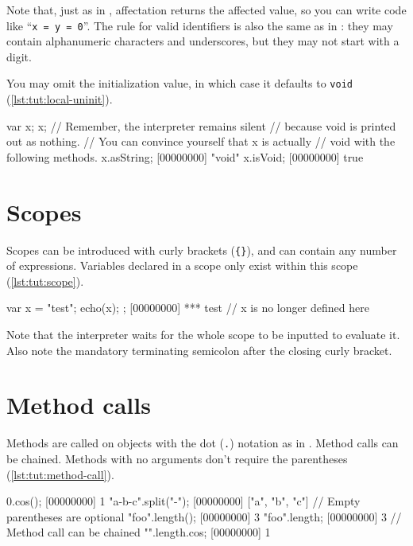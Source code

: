 Note that, just as in \Cxx, affectation returns the affected value, so
you can write code like ``\lstinline|x = y = 0|''. The rule for valid
identifiers is also the same as in \Cxx: they may contain alphanumeric
characters and underscores, but they may not start with a digit.

You may omit the initialization value, in which case it defaults to
\lstinline|void| (\autoref{lst:tut:local-uninit}).

\begin{urbiscript}[caption=Variables initialization defaults to
  nil,label=lst:tut:local-uninit]
var x;
x;
// Remember, the interpreter remains silent
// because void is printed out as nothing.
// You can convince yourself that x is actually
// void with the following methods.
x.asString;
[00000000] "void"
x.isVoid;
[00000000] true
\end{urbiscript}

\section{Scopes}
Scopes can be introduced with curly brackets (\lstinline|{}|), and can
contain any number of expressions. Variables declared in a scope only
exist within this scope (\autoref{lst:tut:scope}).

\begin{urbiscript}[caption=Scoping a variable,label=lst:tut:scope]
{
  var x = "test";
  echo(x);
};
[00000000] *** test
// x is no longer defined here
\end{urbiscript}

Note that the interpreter waits for the whole scope to be inputted to
evaluate it. Also note the mandatory terminating semicolon after the
closing curly bracket.

\section{Method calls}

Methods are called on objects with the dot (\lstinline{.}) notation as in
\Cxx. Method calls can be chained. Methods with no arguments don't
require the parentheses (\autoref{lst:tut:method-call}).

\begin{urbiscript}[caption=Calling methods,label=lst:tut:method-call]
0.cos();
[00000000] 1
"a-b-c".split("-");
[00000000] ["a", "b", "c"]
// Empty parentheses are optional
"foo".length();
[00000000] 3
"foo".length;
[00000000] 3
// Method call can be chained
"".length.cos;
[00000000] 1
\end{urbiscript}

